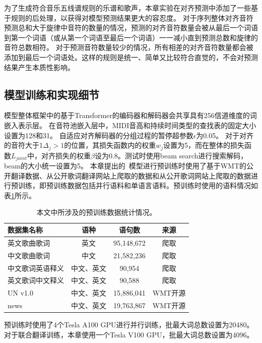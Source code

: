 为了生成符合音乐五线谱规则的乐谱和歌声，本章实验在对齐预测中添加了一些基于规则的后处理，以获得对模型预测结果更大的容忍度。
对于序列整体对齐音符预测总和大于旋律中音符的数量的情况，预测的对齐音符数量会被从最后一个词语到第一个词语（或从第一个词语至最后一个词语）一一减小直到预测总数和旋律的音符总数相符。
对于预测音符数量较少的情况，所有相差的对齐音符数量都会被添加到最后一个词语处。这样的规则是统一、简单又比较符合直觉的，不会对预测结果产生本质性影响。
\subsection{模型训练和实现细节}
模型整体框架中的基于Transformer的编码器和解码器会共享具有256信道维度的词嵌入表示层。
在音符池嵌入层中，MIDI音高和持续时间类型的查找表的固定大小设置为128和31。
自适应对齐解码器的分组过程的暂停超参数$\epsilon$为0.05。
对于对齐的音符大于1$\Delta_j>1$的位置，其损失函数内的权重$w_j$设置为5，而在整体的损失函数$L_{joint}$中，对齐损失的权重$\beta$设为0.8。测试时使用beam search进行搜索解码，beam的大小统一设置为5。
本章提出的\modelname~模型进行预训练时使用了基于WMT的公开翻译数据、从公开歌词翻译网站上爬取的数据和从公开歌词网站上爬取的数据进行预训练，即预训练数据包括并行语料和单语言语料。预训练时使用的语料情况如表\ref{tab:pretrain_data}所示。
\begin{table}[htbp]
    \centering
    \setlength{\belowcaptionskip}{8pt} %
    \caption{本文中所涉及的预训练数据统计情况。}
    \begin{tabular}{|l|c|c|c|}
    \hline
     \textbf{数据集名称} & \textbf{语种} & \textbf{语句数} & \textbf{来源}\\
    \hline
     英文歌曲歌词 & 英文 & 95,148,672 & 爬取 \\
    \hline
     中文歌曲歌词 & 中文 & 21,582,236 & 爬取 \\
    \hline
     中文歌词英语释义 & 中文、英文 & 90,954 & 爬取 \\
    \hline
     英文歌词中文释义 & 中文、英文 & 90,588 & 爬取 \\
    \hline
     UN v1.0 & 中文、英文 & 15,886,041 & WMT开源\\
    \hline
     news & 中文、英文 & 19,763,867 & WMT开源\\
    \hline
    \end{tabular}
    \label{tab:pretrain_data}
\end{table}
预训练时使用了4个Tesla A100 GPU进行并行训练，批最大词总数设置为20480。
对于联合翻译训练，本章使用一个Tesla V100 GPU，批最大词总数设置为4096。

